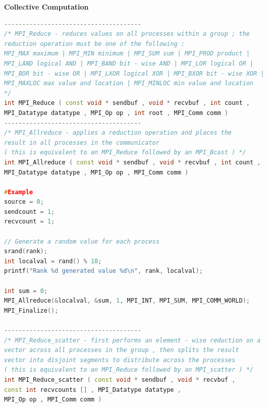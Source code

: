 \documentclass[10pt, landscape]{article}
\begin{document}
\begin{multicols}{4}
\textbf{Collective Computation}
\begin{lstlisting}[language=C++, breaklines=true, breakatwhitespace=true]
--------------------------------------
/* MPI_Reduce - reduces values on all processes within a group ; the
reduction operation must be one of the following :
MPI_MAX maximum | MPI_MIN minimum | MPI_SUM sum | MPI_PROD product |
MPI_LAND logical AND | MPI_BAND bit - wise AND | MPI_LOR logical OR |
MPI_BOR bit - wise OR | MPI_LXOR logical XOR | MPI_BXOR bit - wise XOR |
MPI_MAXLOC max value and location | MPI_MINLOC min value and location
*/
int MPI_Reduce ( const void * sendbuf , void * recvbuf , int count ,
MPI_Datatype datatype , MPI_Op op , int root , MPI_Comm comm )
--------------------------------------
/* MPI_Allreduce - applies a reduction operation and places the
result in all processes in the communicator
( this is equivalent to an MPI_Reduce followed by an MPI_Bcast ) */
int MPI_Allreduce ( const void * sendbuf , void * recvbuf , int count ,
MPI_Datatype datatype , MPI_Op op , MPI_Comm comm )

#Example
source = 0;
sendcount = 1;
recvcount = 1;

// Generate a random value for each process
srand(rank);
int localval = rand() % 10;
printf("Rank %d generated value %d\n", rank, localval);

int sum = 0;
MPI_Allreduce(&localval, &sum, 1, MPI_INT, MPI_SUM, MPI_COMM_WORLD);
MPI_Finalize();

--------------------------------------
/* MPI_Reduce_scatter - first performs an element - wise reduction on a
vector across all processes in the group , then splits the result
vector into disjoint segments to distribute across the processes
( this is equivalent to an MPI_Reduce followed by an MPI_scatter ) */
int MPI_Reduce_scatter ( const void * sendbuf , void * recvbuf ,
const int recvcounts [] , MPI_Datatype datatype ,
MPI_Op op , MPI_Comm comm )
    \end{lstlisting}


\end{multicols}
\end{document}
